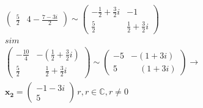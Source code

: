 \begin{example}
\begin{align*}
\begin{pmatrix}
      \frac{5}{2}                &  4 - \frac{7-3i}{2}
    \end{pmatrix}
    \sim
    \begin{pmatrix}
      -\frac{1}{2}+\frac{3}{2}i  &  -1                                     \\
      \frac{5}{2}                & \frac{1}{2}+\frac{3}{2}i
    \end{pmatrix}
    \\sim \\
    \begin{pmatrix}
      -\frac{10}{4}              &-\left(\frac{1}{2} +\frac{3}{2}i\right)  \\
      \frac{5}{2}                & \quad\frac{1}{2}+\frac{3}{2}i
    \end{pmatrix}
    \sim
    \begin{pmatrix}
      -5                         &-\left(1+3i\right)                       \\
       5                         & \quad\left(1+3i\right)
    \end{pmatrix}
    \rightarrow\\
    \mathbf{x_2}=
    \begin{pmatrix}
      -1-3i \\ 5
    \end{pmatrix}
    \, r, r\in\mathbb{C}, r\neq0
  \end{align*}
\end{example}

\begin{lstlisting}[caption=Výpis programu pro ověření výpočtu vlastních čísel matic programem
  Matlab.]
\end{lstlisting}
